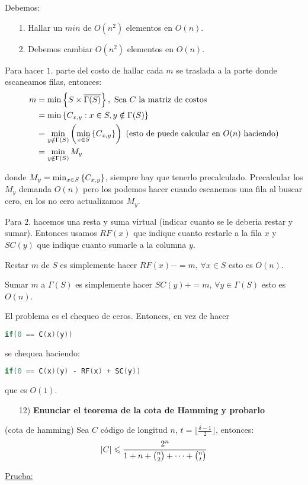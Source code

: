 \documentclass[12pt,a4paper]{article}
\begin{document}
Debemos:
\begin{itemize}
    \item [1.] Hallar un $min$ de $O(n^{2})$ elementos en $O(n)$.
    \item [2.] Debemos cambiar $O(n^{2})$ elementos en $O(n)$.
\end{itemize}

Para hacer $1.$ parte del costo de hallar cada $m$ se traslada a la parte donde 
escaneamos filas, entonces:
\begin{align*}
    m &= \min \left\lbrace S \times \overline{\Gamma(S)} \right\rbrace,\,\, \text{Sea $C$ la matriz de costos} \\
    &= \min \left\lbrace C_{x,y} : x \in S, y \notin \Gamma(S) \right\rbrace \\
    &= \min_{y\notin \Gamma(S)} \left(\min_{x\in S}\left\lbrace C_{x,y} \right\rbrace\right)\,\,(\text{esto de puede calcular en $O(n)$ haciendo})\\
    &= \min_{y \notin \Gamma(S)} M_{y} 
\end{align*}

donde $M_{y} = \min_{x\in S}\left\lbrace C_{x,y} \right\rbrace$, siempre hay que tenerlo precalculado. Precalcular 
los $M_{y}$ demanda $O(n)$ pero los podemos hacer cuando escanemos una fila al 
buscar cero, en los no cero actualizamos $M_{y}$.
\medskip

Para $2.$ hacemos una resta y suma virtual (indicar cuanto se le deberia restar y sumar). 
Entonces usamos $RF(x)$ que indique cuanto restarle a la fila $x$ y $SC(y)$ que indique 
cuanto sumarle a la columna $y$.
\medskip

Restar $m$ de $S$ es simplemente hacer $RF(x) -= m,\, \forall x\in S$ esto es $O(n)$.

Sumar $m$ a $\Gamma(S)$ es simplemente hacer $SC(y) += m,\, \forall y\in \Gamma(S)$ esto es $O(n)$.
\medskip

El problema es el chequeo de ceros. Entonces, en vez de hacer
\begin{lstlisting}[language=C]
    if(0 == C(x)(y))
\end{lstlisting}

se chequea haciendo:
\begin{lstlisting}[language=C]
    if(0 == C(x)(y) - RF(x) + SC(y))
\end{lstlisting}
que es $O(1)$.

\begin{itemize}
    \item [12)] \textbf{Enunciar el teorema de la cota de Hamming y probarlo}
    \label{dem:hamming}
\end{itemize}
\begin{teorema} (cota de hamming) Sea $C$ código de longitud $n$, $t = \lfloor \frac{\delta -1}{2} \rfloor$, entonces:
    $$|C| \leqslant \frac{2^{n}}{1+n+ \binom{n}{2} + \cdots + \binom{n}{t}}$$
\end{teorema}
\underline{Prueba:}
\end{document}

